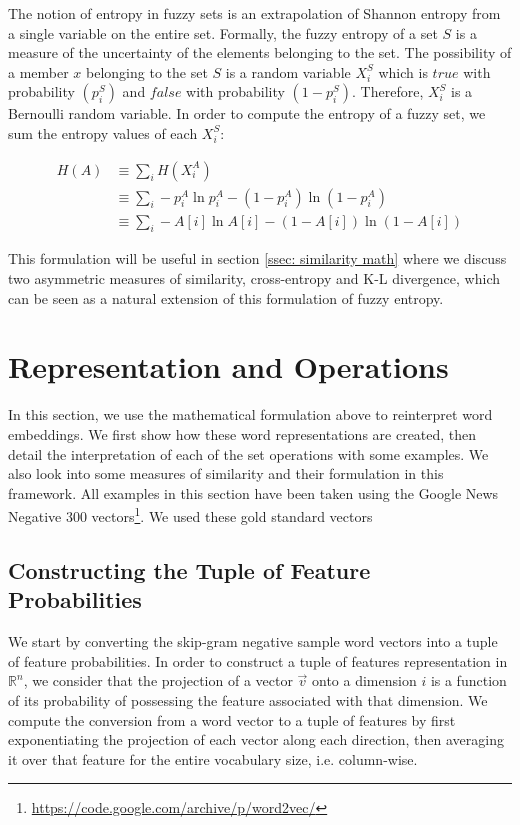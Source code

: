 \documentclass[11pt]{book}
\begin{document}
The notion of entropy in fuzzy sets is an extrapolation of Shannon entropy from
a single variable on the entire set. Formally, the fuzzy entropy of a set $S$
is a measure of the uncertainty of the elements belonging to the set. The
possibility of a member $x$ belonging to the set $S$ is a random variable
$X_i^S$ which is $true$ with probability $(p_i^S)$ and $false$ with probability
$(1-p^S_i)$. Therefore, $X_i^S$ is a Bernoulli random variable. In order to
compute the entropy of a fuzzy set, we sum the entropy values of each $X_i^S$:

{\footnotesize \begin{align*} H(A) &\equiv \sum_i H(X^A_i) \\ &\equiv \sum_i
-p_i^A \ln p_i^A - (1 - p_i^A) \ln (1 - p_i^A) \\ &\equiv  \sum_i -A[i] \ln
A[i] - (1 - A[i]) \ln (1 - A[i]) \end{align*} }

This formulation will be useful in section \ref{ssec: similarity math} where we
discuss two asymmetric measures of similarity, cross-entropy and K-L
divergence, which can be seen as a natural extension of this formulation of
fuzzy entropy.

\section{Representation and Operations} \label{sec: meat of the paper}

In this section, we use the mathematical formulation above to reinterpret word
embeddings. We first show how these word representations are created, then
detail the interpretation of each of the set operations with some examples. We
also look into some measures of similarity and their formulation in this
framework. All examples in this section have been taken using the Google News
Negative 300
vectors\footnote{\url{https://code.google.com/archive/p/word2vec/}}. We used
these gold standard vectors 

\subsection{Constructing the Tuple of Feature Probabilities} \label{ssec:
constructing}

We start by converting the skip-gram negative sample word vectors into a tuple
of feature probabilities. In order to construct a tuple of features
representation in $\mathbb{R}^n$, we consider that the projection of a vector
$\vec v$ onto a dimension $i$ is a function of its probability of possessing
the feature associated with that dimension.  We compute the conversion from a
word vector to a tuple of features by first exponentiating the projection of
each vector along each direction, then averaging it over that feature for the
entire vocabulary size, i.e. column-wise.
\end{document}
